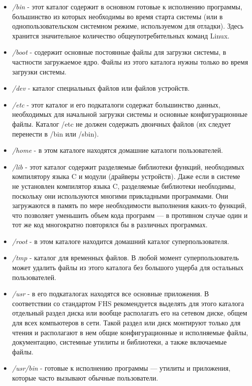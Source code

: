 \documentclass[14pt,a4paper,report]{report}
\begin{document}
\begin{itemize}
	\item \emph{/bin} - этот каталог содержит в основном готовые к исполнению программы, большинство из которых необходимы во время старта системы (или в однопользовательском системном режиме, используемом для отладки). Здесь хранится значительное количество общеупотребительных команд Linux.
	\item \emph{/boot} - содержит основные постоянные файлы для загрузки системы, в частности загружаемое ядро. Файлы из этого каталога нужны только во время загрузки системы.
	\item \emph{/dev} - каталог специальных файлов или файлов устройств.
	\item \emph{/etc} - этот каталог и его подкаталоги содержат большинство данных, необходимых для начальной загрузки системы и основные конфигурационные файлы. Каталог /etc не должен содержать двоичных файлов (их следует перенести в /bin или /sbin).
	\item \emph{/home} - в этом каталоге находятся домашние каталоги пользователей.
	\item \emph{/lib} - этот каталог содержит разделяемые библиотеки функций, необходимых компилятору языка C и модули (драйверы устройств). Даже если в системе не установлен компилятор языка C, разделяемые библиотеки необходимы, поскольку они используются многими прикладными программами. Они загружаются в память по мере необходимости выполнения каких-то функций, что позволяет уменьшить объем кода программ — в противном случае один и тот же код многократно повторялся бы в различных программах.
	\item \emph{/root} - в этом каталоге находится домашний каталог суперпользователя.
	\item \emph{/tmp} - каталог для временных файлов. В любой момент суперпользователь может удалить файлы из этого каталога без большого ущерба для остальных пользователей.
	\item \emph{/usr} - в его подкаталогах находятся все основные приложения. В соответствии со стандартом FHS рекомендуется выделять для этого каталога отдельный раздел диска или вообще располагать его на сетевом диске, общем для всех компьютеров в сети. Такой раздел или диск монтируют только для чтения и располагают в нем общие конфигурационные и исполняемые файлы, документацию, системные утилиты и библиотеки, а также включаемые файлы.
	\item \emph{/usr/bin} - готовые к исполнению программы — утилиты и приложения, которые часто вызывают обычные пользователи.

\end{itemize}
\end{document}

